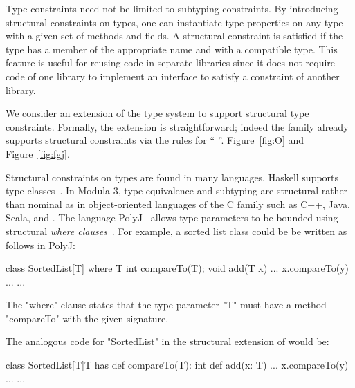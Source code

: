Type constraints need not be limited to subtyping constraints.
By introducing structural constraints on types, one can
instantiate
type properties on any type with a given set
of methods and fields.
A structural constraint is satisfied if the type has a member of
the appropriate name and with a compatible type.
This feature is useful for reusing code
in separate libraries since it does not require
code of one library to implement an interface to satisfy a
constraint of another library.

We consider an extension of the \Xten{} type system
to support structural type constraints.  Formally, the extension
is straightforward; indeed the \FX{} family already supports structural
constraints
via the rules for ``  ''.
Figure~\ref{fig:O} and Figure~\ref{fig:fgj}.

Structural constraints on types are found in many languages.
Haskell supports type
classes~\cite{haskell,haskell-type-classes}.
%
In Modula-3, type equivalence and subtyping are structural
rather than nominal as in object-oriented languages of the C
family such as C++, Java, Scala, and \Xten{}.
%
The language PolyJ~\cite{java-popl97} allows type parameters to be
bounded using
structural \emph{where clauses}~\cite{where-clauses}.
For example, a sorted list class %
could be
be written as follows in PolyJ:
{
\begin{xten}
class SortedList[T] where T {int compareTo(T);} {
    void add(T x) { ... x.compareTo(y) ... }
    ...
}
\end{xten}}
The \xcd"where" clause states that the type parameter \xcd"T" must have a
method \xcd"compareTo" with the given signature.

The analogous code for \xcd"SortedList" in the structural
extension of \Xten{} would be:
{
\begin{xten}
class SortedList[T]{T has def compareTo(T): int} {
    def add(x: T) { ... x.compareTo(y) ... }
    ...
}
\end{xten}}



